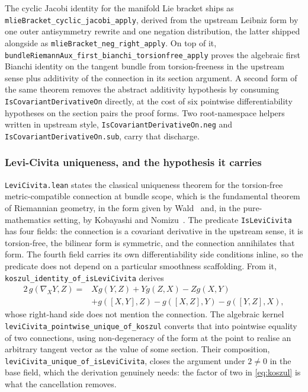 \documentclass[11pt]{article}
\begin{document}
The cyclic Jacobi identity for the manifold Lie bracket ships as
\texttt{mlieBracket\_cyclic\_jacobi\_apply}, derived from the upstream
Leibniz form by one outer antisymmetry rewrite and one negation
distribution, the latter shipped alongside as
\texttt{mlieBracket\_neg\_right\_apply}. On top of it,
\texttt{bundleRiemannAux\_first\_bianchi\_torsionfree\_apply} proves the
algebraic first Bianchi identity on the tangent bundle from
torsion-freeness in the upstream sense plus additivity of the connection
in its section argument. A second form of the same theorem removes the
abstract additivity hypothesis by consuming
\texttt{IsCovariantDerivativeOn} directly, at the cost of six pointwise
differentiability hypotheses on the section pairs the proof forms. Two
root-namespace helpers written in upstream style,
\texttt{IsCovariantDerivativeOn.neg} and
\texttt{IsCovariantDerivativeOn.sub}, carry that discharge.

\subsubsection{Levi-Civita uniqueness, and the hypothesis it carries}

\texttt{LeviCivita.lean} states the classical uniqueness theorem for the
torsion-free metric-compatible connection at bundle scope, which is the
fundamental theorem of Riemannian geometry, in the form given by
Wald~\cite[Theorem 3.1.1]{Wald1984} and, in the pure-mathematics
setting, by Kobayashi and Nomizu~\cite[Theorem IV.2.2]{KobayashiNomizu1963}. The predicate
\texttt{IsLeviCivita} has four fields: the connection is a covariant
derivative in the upstream sense, it is torsion-free, the bilinear form
is symmetric, and the connection annihilates that form. The fourth field
carries its own differentiability side conditions inline, so the
predicate does not depend on a particular smoothness scaffolding.
From it, \texttt{koszul\_identity\_of\_isLeviCivita} derives
\begin{align}
2\,g(\nabla_{X}Y, Z) ={}& X g(Y,Z) + Y g(Z,X) - Z g(X,Y) \nonumber \\
 & + g([X,Y], Z) - g([X,Z], Y) - g([Y,Z], X),
\label{eq:koszul}
\end{align}
whose right-hand side does not mention the connection. The algebraic
kernel \texttt{leviCivita\_pointwise\_unique\_of\_koszul} converts that
into pointwise equality of two connections, using non-degeneracy of the
form at the point to realise an arbitrary
tangent vector as the value of some section. Their composition,
\texttt{leviCivita\_unique\_of\_isLeviCivita}, closes the argument under
$2 \neq 0$ in the base field, which the derivation genuinely needs: the
factor of two in \eqref{eq:koszul} is what the cancellation removes.
\end{document}
